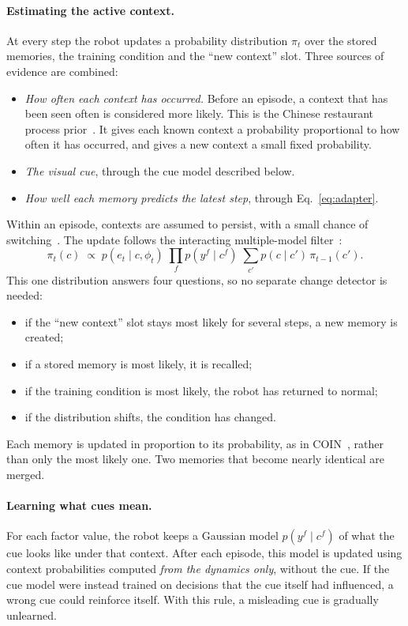 \documentclass[10pt]{article}
\begin{document}
\paragraph{Estimating the active context.}
At every step the robot updates a probability distribution $\pi_t$ over the stored memories, the
training condition and the ``new context'' slot. Three sources of evidence are combined:
\begin{itemize}
  \item \emph{How often each context has occurred.} Before an episode, a context that has been seen
  often is considered more likely. This is the Chinese restaurant process
  prior~\cite{neal2000dpm}. It gives each known context a probability proportional to how often it
  has occurred, and gives a new context a small fixed probability.
  \item \emph{The visual cue}, through the cue model described below.
  \item \emph{How well each memory predicts the latest step}, through Eq.~\eqref{eq:adapter}.
\end{itemize}
Within an episode, contexts are assumed to persist, with a small chance of
switching~\cite{fox2011sticky}. The update
follows the interacting multiple-model filter~\cite{blom1988imm}:
\[
  \pi_t(c)\;\propto\;p(e_t\mid c,\phi_t)\;\prod_f p(y^f\mid c^f)\;\sum_{c'}p(c\mid c')\,\pi_{t-1}(c').
\]
This one distribution answers four questions, so no separate change detector is needed:
\begin{itemize}
  \item if the ``new context'' slot stays most likely for several steps, a new memory is created;
  \item if a stored memory is most likely, it is recalled;
  \item if the training condition is most likely, the robot has returned to normal;
  \item if the distribution shifts, the condition has changed.
\end{itemize}
Each memory is updated in proportion to its probability, as in COIN~\cite{heald2021coin}, rather than
only the most likely one. Two memories that become nearly identical are merged.

\paragraph{Learning what cues mean.}
For each factor value, the robot keeps a Gaussian model $p(y^f\mid c^f)$ of what the cue looks like
under that context. After each episode, this model is updated using context probabilities computed
\emph{from the dynamics only}, without the cue. If the cue model were instead trained on decisions that the cue itself had
influenced, a wrong cue could reinforce itself. With this rule, a misleading cue is gradually
unlearned.
\end{document}
